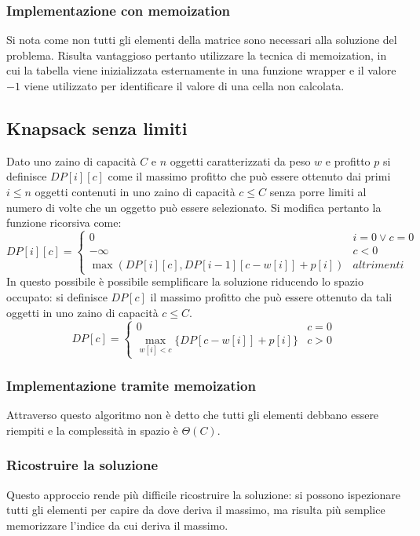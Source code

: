 \subsubsection{Implementazione con memoization}
Si nota come non tutti gli elementi della matrice sono necessari alla soluzione del problema. Risulta vantaggioso pertanto utilizzare la tecnica di 
memoization, in cui la tabella viene inizializzata esternamente in una funzione wrapper e il valore $-1$ viene utilizzato per identificare il valore di
una cella non calcolata. \\

\subsection{Knapsack senza limiti}
Dato uno zaino di capacit\`a $C$ e $n$ oggetti caratterizzati da peso $w$ e profitto $p$ si definisce $DP[i][c]$ come il massimo profitto che pu\`o essere
ottenuto dai primi $i\le n$ oggetti contenuti in uno zaino di capacit\`a $c\le C$ senza porre limiti al numero di volte che un oggetto pu\`o essere 
selezionato. Si modifica pertanto la funzione ricorsiva come:
$$
DP[i][c] =
\begin{cases}
0\quad & i = 0 \lor c = 0\\
-\infty & c<0\\
\max(DP[i][c], DP[i-1][c-w[i]]+p[i]) & altrimenti
\end{cases}
$$
In questo possibile \`e possibile semplificare la soluzione riducendo lo spazio occupato: si definisce $DP[c]$ il massimo profitto che pu\`o essere ottenuto
da tali oggetti in uno zaino di capacit\`a $c\le C$. 
$$
DP[c] =
\begin{cases}
0\quad & c = 0\\
\max\limits_{w[i]<c}\{DP[c-w[i]]+p[i]\} &  c > 0
\end{cases}
$$
\subsubsection{Implementazione tramite memoization}

Attraverso questo algoritmo non \`e detto che tutti gli elementi debbano essere riempiti e la complessit\`a in spazio \`e $\Theta(C)$.
\subsubsection{Ricostruire la soluzione}
Questo approccio rende pi\`u difficile ricostruire la soluzione: si possono ispezionare tutti gli elementi per capire da dove deriva il massimo, ma 
risulta pi\`u semplice memorizzare l'indice da cui deriva il massimo. 
